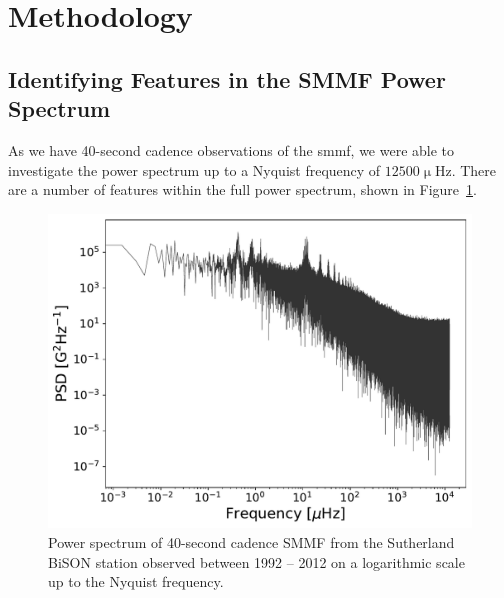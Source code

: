 %
%
%






\section{Methodology}\label{sec:SMMF_method}


\subsection{Identifying Features in the SMMF Power Spectrum}

As we have 40-second cadence observations of the \gls{smmf}, we were able to investigate the power spectrum up to a Nyquist frequency of $12500 \upmu\mathrm{Hz}$. There are a number of features within the full power spectrum, shown in Figure~\ref{fig:BiSON_FT_full}.

\begin{figure}[ht!]
	\centering
	\includegraphics[width=\columnwidth]{BiSON_SMMF_FT_full.pdf}
	\caption{Power spectrum of 40-second cadence SMMF from the Sutherland BiSON station observed between 1992 -- 2012 on a logarithmic scale up to the Nyquist frequency.}
	\label{fig:BiSON_FT_full}
\end{figure}

